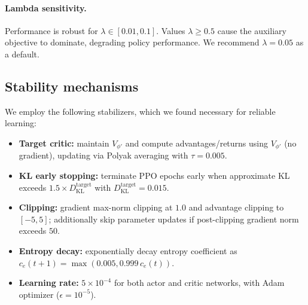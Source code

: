 \documentclass{article}
\theoremstyle{plain}
\theoremstyle{definition}
\theoremstyle{remark}
\begin{document}
\paragraph{Lambda sensitivity.}
Performance is robust for $\lambda \in [0.01, 0.1]$. Values $\lambda \geq 0.5$ cause the auxiliary objective to dominate, degrading policy performance. We recommend $\lambda = 0.05$ as a default.

\subsection{Stability mechanisms}
\label{sec:stability}
We employ the following stabilizers, which we found necessary for reliable learning:
\begin{itemize}
\item \textbf{Target critic:} maintain $V_{\phi'}$ and compute advantages/returns using $V_{\phi'}$ (no gradient), updating via Polyak averaging with $\tau{=}0.005$.
\item \textbf{KL early stopping:} terminate PPO epochs early when approximate KL exceeds $1.5\times D_{\mathrm{KL}}^{\mathrm{target}}$ with $D_{\mathrm{KL}}^{\mathrm{target}}{=}0.015$.
\item \textbf{Clipping:} gradient max-norm clipping at $1.0$ and advantage clipping to $[-5,5]$; additionally skip parameter updates if post-clipping gradient norm exceeds $50$.
\item \textbf{Entropy decay:} exponentially decay entropy coefficient as $c_e(t{+}1)=\max(0.005,0.999\,c_e(t))$.
\item \textbf{Learning rate:} $5\times10^{-4}$ for both actor and critic networks, with Adam optimizer ($\epsilon=10^{-5}$).
\end{itemize}
\end{document}

